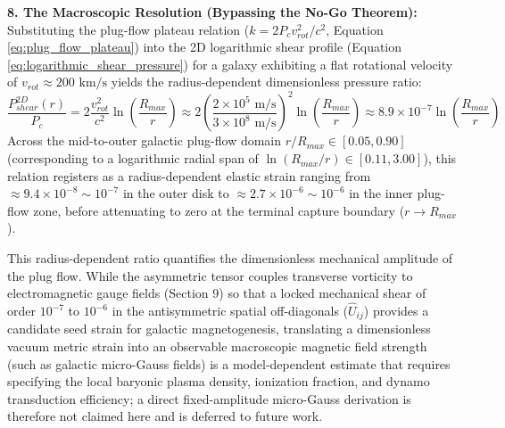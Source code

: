 \vspace{0.2 cm}

\textbf{8. The Macroscopic Resolution (Bypassing the No-Go Theorem):} \\
Substituting the plug-flow plateau relation ($k = 2 P_c v_{rot}^2 / c^2$, Equation \ref{eq:plug_flow_plateau}) into the 2D logarithmic shear profile (Equation \ref{eq:logarithmic_shear_pressure}) for a galaxy exhibiting a flat rotational velocity of $v_{rot} \approx 200 \text{ km/s}$ yields the radius-dependent dimensionless pressure ratio: 
\begin{equation}
    \frac{P_{shear}^{2D}(r)}{P_c} = 2 \frac{v_{rot}^2}{c^2} \ln \left( \frac{R_{max}}{r} \right) \approx 2 \left( \frac{2 \times 10^5 \text{ m/s}}{3 \times 10^8 \text{ m/s}} \right)^2 \ln \left( \frac{R_{max}}{r} \right) \approx 8.9 \times 10^{-7} \ln \left( \frac{R_{max}}{r} \right) \label{eq:shear_pressure_ratio}
\end{equation}
Across the mid-to-outer galactic plug-flow domain $r / R_{max} \in [0.05, 0.90]$ (corresponding to a logarithmic radial span of $\ln(R_{max}/r) \in [0.11, 3.00]$), this relation registers as a radius-dependent elastic strain ranging from $\approx 9.4 \times 10^{-8} \sim 10^{-7}$ in the outer disk to $\approx 2.7 \times 10^{-6} \sim 10^{-6}$ in the inner plug-flow zone, before attenuating to zero at the terminal capture boundary ($r \to R_{max}$). %

This radius-dependent ratio quantifies the dimensionless mechanical amplitude of the plug flow. %
While the asymmetric tensor couples transverse vorticity to electromagnetic gauge fields (Section 9) so that a locked mechanical shear of order $10^{-7}$ to $10^{-6}$ in the antisymmetric spatial off-diagonals ($\hat{U}_{ij}$) provides a candidate seed strain for galactic magnetogenesis, translating a dimensionless vacuum metric strain into an observable macroscopic magnetic field strength (such as galactic micro-Gauss fields) is a model-dependent estimate that requires specifying the local baryonic plasma density, ionization fraction, and dynamo transduction efficiency; a direct fixed-amplitude micro-Gauss derivation is therefore not claimed here and is deferred to future work. %


